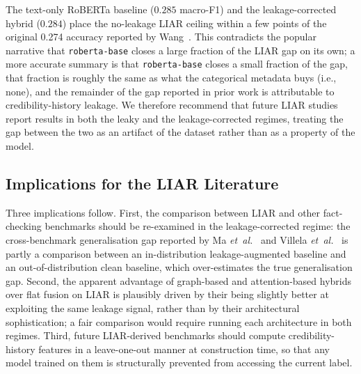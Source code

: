 \documentclass[journal]{IEEEtran}
\begin{document}
The text-only RoBERTa baseline ($0.285$ macro-F1) and the leakage-corrected hybrid ($0.284$) place the no-leakage LIAR ceiling within a few points of the original 0.274 accuracy reported by Wang~\cite{wang2017liar}. This contradicts the popular narrative that \texttt{roberta-base} closes a large fraction of the LIAR gap on its own; a more accurate summary is that \texttt{roberta-base} closes a small fraction of the gap, that fraction is roughly the same as what the categorical metadata buys (i.e., none), and the remainder of the gap reported in prior work is attributable to credibility-history leakage. We therefore recommend that future LIAR studies report results in both the leaky and the leakage-corrected regimes, treating the gap between the two as an artifact of the dataset rather than as a property of the model.

\subsection{Implications for the LIAR Literature}
Three implications follow. First, the comparison between LIAR and other fact-checking benchmarks should be re-examined in the leakage-corrected regime: the cross-benchmark generalisation gap reported by Ma \emph{et~al.}~\cite{ma2024emnlp} and Villela \emph{et~al.}~\cite{villela2023} is partly a comparison between an in-distribution leakage-augmented baseline and an out-of-distribution clean baseline, which over-estimates the true generalisation gap. Second, the apparent advantage of graph-based and attention-based hybrids over flat fusion on LIAR is plausibly driven by their being slightly better at exploiting the same leakage signal, rather than by their architectural sophistication; a fair comparison would require running each architecture in both regimes. Third, future LIAR-derived benchmarks should compute credibility-history features in a leave-one-out manner at construction time, so that any model trained on them is structurally prevented from accessing the current label.
\end{document}
